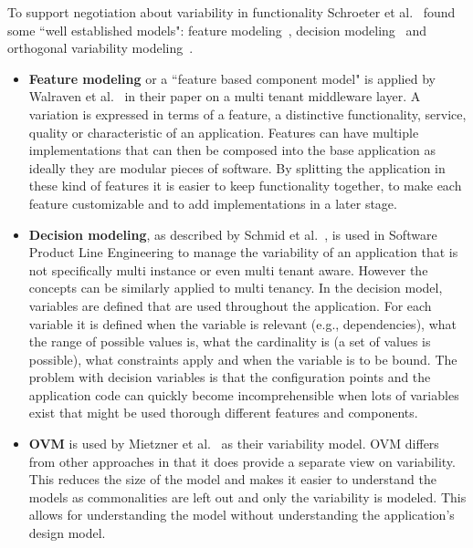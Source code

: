 To support negotiation about variability in functionality Schroeter et al.~\cite{schroeter2012towards} found some ``well established models": feature modeling~\cite{benavides2010automated,kang1990feature}, decision modeling~\cite{schmid2004customizable,schmid2011comparison} and orthogonal variability modeling~\cite{lauenroth2005software}.

\begin{itemize}
\item \textbf{Feature modeling} or a ``feature based component model" is applied by Walraven et al.~\cite{walraven2011middleware} in their paper on a multi tenant middleware layer. A variation is
expressed in terms of a feature, a distinctive functionality, service, quality or characteristic of an 
application. Features can have multiple implementations that can then be composed into the 
base application as ideally they are modular pieces of software. By splitting the application in 
these kind of features it is easier to keep functionality together, to make each feature 
customizable and to add implementations in a later stage.

\item \textbf{Decision modeling}, as described by Schmid et al.~\cite{schmid2004customizable}, is used in 
Software Product Line Engineering to manage the variability of an application that is not specifically 
multi instance or even multi tenant aware. However the concepts can be similarly applied to 
multi tenancy. In the decision model, variables are defined that are used throughout the 
application. For each variable it is defined when the variable is relevant (e.g., dependencies), 
what the range of possible values is, what the cardinality is (a set of values is possible), what 
constraints apply and when the variable is to be bound. The problem with decision variables is 
that the configuration points and the application code can quickly become incomprehensible 
when lots of variables exist that might be used thorough different features and components.

\item \textbf{\acf{OVM}} is used by Mietzner et al.~\cite{mietzner2009variability} as their variability model. \ac{OVM} differs from other approaches in that it does provide a separate view on variability. This reduces the size of the model and makes it easier to understand the models as commonalities are left out and only the variability is modeled. This allows for understanding the model without understanding the application's design model. 


\end{itemize}
